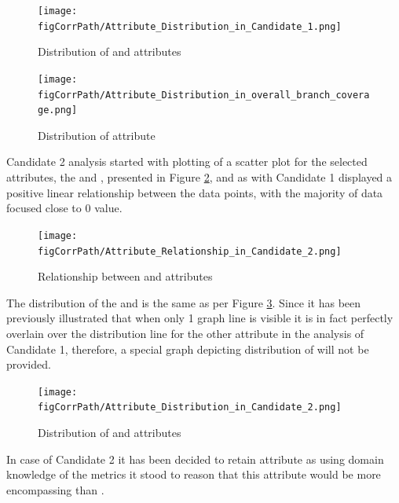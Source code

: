 \begin{enumerate}
\begin{landscape}
\begin{figure}
\centering
\begin{minipage}{0.89\textwidth}
  \centering
  \texttt{[image: \\figCorrPath/Attribute\_Distribution\_in\_Candidate\_1.png]}
    \caption{Distribution of \overallBranchCoverage{} and \branchCoverage{} attributes}
    \label{fig:candidate1-distribution}
\end{minipage}%
\begin{minipage}{0.89\textwidth}
   \texttt{[image: \\figCorrPath/Attribute\_Distribution\_in\_overall\_branch\_coverage.png]}
    \caption{Distribution of \overallBranchCoverage{} attribute}
    \label{fig:candidate1-attrib2-distribution}
\end{minipage}
\end{figure}
\end{landscape}
\FloatBarrier

Candidate 2 analysis started with plotting of a scatter plot for the selected attributes, the \overallUncoveredLines{} and \uncoveredLines{}, presented in Figure \ref{fig:candidate2-scatterplot}, and as with Candidate 1 displayed a positive linear relationship between the data points, with the majority of data focused close to 0 value.

\begin{figure}[h!]
    \centering
    \texttt{[image: \\figCorrPath/Attribute\_Relationship\_in\_Candidate\_2.png]}
    \caption{Relationship between \overallUncoveredLines{} and \uncoveredLines{} attributes}
    \label{fig:candidate2-scatterplot}
\end{figure}

The distribution of the \overallUncoveredLines{} and \uncoveredLines{} is the same as per Figure \ref{fig:candidate2-distribution}. Since it has been previously illustrated that when only 1 graph line is visible it is in fact perfectly overlain over the distribution line for the other attribute in the analysis of Candidate 1, therefore, a special graph depicting distribution of \uncoveredLines{} will not be provided.
\begin{figure}
    \centering
  \texttt{[image: \\figCorrPath/Attribute\_Distribution\_in\_Candidate\_2.png]}
    \caption{Distribution of \overallUncoveredLines{} and \uncoveredLines{} attributes}
    \label{fig:candidate2-distribution}
\end{figure}
In case of Candidate 2 it  has been decided to retain \overallUncoveredLines{} attribute as using domain knowledge of the metrics it stood to reason that this attribute would be more encompassing than \uncoveredLines{}.
\FloatBarrier


\end{enumerate}
